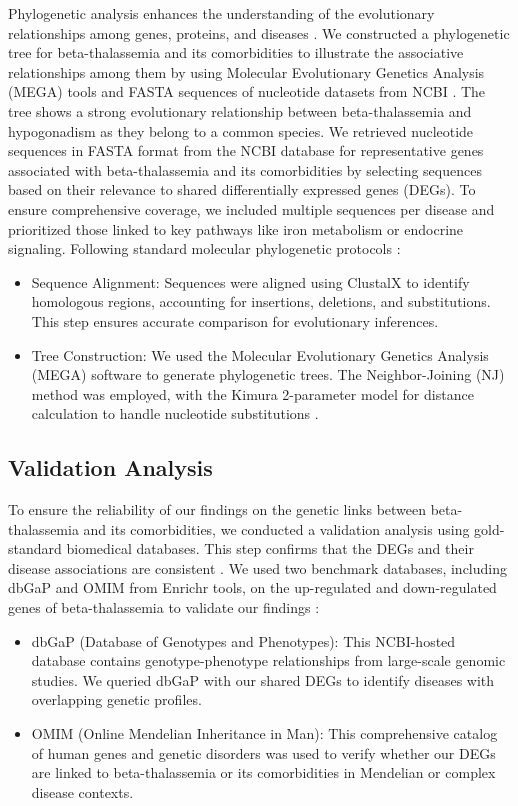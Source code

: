 Phylogenetic analysis enhances the understanding of the evolutionary relationships among genes, proteins, and diseases \cite{b18}. We constructed a phylogenetic tree for beta-thalassemia and its comorbidities to illustrate the associative relationships among them by using Molecular Evolutionary Genetics Analysis (MEGA) tools and FASTA sequences of nucleotide datasets from NCBI \cite{b18}. The tree shows a strong evolutionary relationship between beta-thalassemia and hypogonadism as they belong to a common species.
We retrieved nucleotide sequences in FASTA format from the NCBI database for representative genes associated with beta-thalassemia and its comorbidities by selecting sequences based on their relevance to shared differentially expressed genes (DEGs). To ensure comprehensive coverage, we included multiple sequences per disease and prioritized those linked to key pathways like iron metabolism or endocrine signaling.
Following standard molecular phylogenetic protocols \cite{23}:
\begin{itemize}
    \item Sequence Alignment: Sequences were aligned using ClustalX to identify homologous regions, accounting for insertions, deletions, and substitutions. This step ensures accurate comparison for evolutionary inferences.
    \item Tree Construction: We used the Molecular Evolutionary Genetics Analysis (MEGA) software to generate phylogenetic trees. The Neighbor-Joining (NJ) method was employed, with the Kimura 2-parameter model for distance calculation to handle nucleotide substitutions \cite{37}.
\end{itemize}

\vspace*{-\parskip}
\subsection{Validation Analysis}
\label{sec:validation}

To ensure the reliability of our findings on the genetic links between beta-thalassemia and its comorbidities, we conducted a validation analysis using gold-standard biomedical databases. This step confirms that the DEGs and their disease associations are consistent \cite{b22}. We used two benchmark databases, including dbGaP and OMIM from Enrichr tools, on the up-regulated and down-regulated genes of beta-thalassemia to validate our findings \cite{b22}:
\begin{itemize}
    \item dbGaP (Database of Genotypes and Phenotypes): This NCBI-hosted database contains genotype-phenotype relationships from large-scale genomic studies. We queried dbGaP with our shared DEGs to identify diseases with overlapping genetic profiles.
    \item OMIM (Online Mendelian Inheritance in Man): This comprehensive catalog of human genes and genetic disorders was used to verify whether our DEGs are linked to beta-thalassemia or its comorbidities in Mendelian or complex disease contexts.
\end{itemize}

